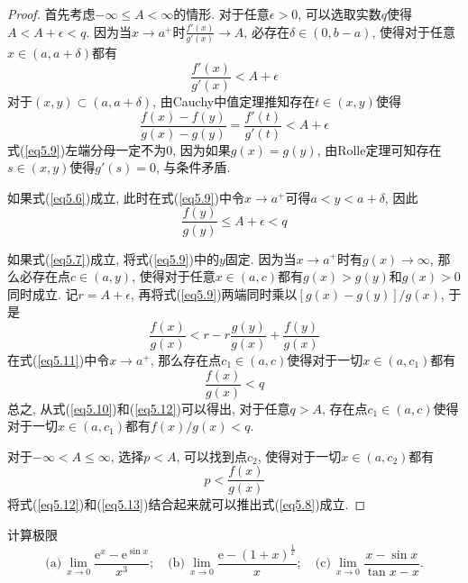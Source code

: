 \documentclass[cn,12pt,math=mtpro2,citestyle=gb7714-2015,bibstyle=gb7714-2015,twocol]{elegantbook}
\begin{document}
\begin{proof}
  首先考虑$-\infty\leq A<\infty$的情形. 对于任意$\epsilon>0$, 可以选取实数$q$使得$A<A+\epsilon<q$. 因为当$x\rightarrow a^+$时$\displaystyle\frac{f'(x)}{g'(x)}\rightarrow A$, 必存在$\delta\in (0,b-a)$, 使得对于任意$x\in(a,a+\delta)$都有
  $$\frac{f'(x)}{g'(x)}<A+\epsilon$$
  对于$(x,y)\subset (a,a+\delta)$, 由Cauchy中值定理推知存在$t\in(x,y)$使得
  \begin{equation}\label{eq5.9}
    \frac{f(x)-f(y)}{g(x)-g(y)}=\frac{f'(t)}{g'(t)}<A+\epsilon
  \end{equation}
  式(\ref{eq5.9})左端分母一定不为$0$, 因为如果$g(x)=g(y)$, 由Rolle定理可知存在$s\in(x,y)$使得$g'(s)=0$, 与条件矛盾.

  如果式(\ref{eq5.6})成立, 此时在式(\ref{eq5.9})中令$x\rightarrow a^+$可得$a<y<a+\delta$, 因此
  \begin{equation}\label{eq5.10}
    \frac{f(y)}{g(y)}\leq A+\epsilon<q
  \end{equation}

  如果式(\ref{eq5.7})成立, 将式(\ref{eq5.9})中的$y$固定. 因为当$x\rightarrow a^+$时有$g(x)\rightarrow\infty$, 那么必存在点$c\in (a,y)$, 使得对于任意$x\in (a,c)$都有$g(x)>g(y)$和$g(x)>0$同时成立. 记$r=A+\epsilon$, 再将式(\ref{eq5.9})两端同时乘以$[g(x)-g(y)]/g(x)$, 于是
  \begin{equation}\label{eq5.11}
    \frac{f(x)}{g(x)}<r-r\frac{g(y)}{g(x)}+\frac{f(y)}{g(x)}
  \end{equation}
  在式(\ref{eq5.11})中令$x\rightarrow a^+$, 那么存在点$c_1\in(a,c)$使得对于一切$x\in (a,c_1)$都有
  \begin{equation}\label{eq5.12}
    \frac{f(x)}{g(x)}<q
  \end{equation}
  总之, 从式(\ref{eq5.10})和(\ref{eq5.12})可以得出, 对于任意$q>A$, 存在点$c_1\in (a,c)$使得对于一切$x\in (a,c_1)$都有$f(x)/g(x)<q$.

  对于$-\infty<A\leq\infty$, 选择$p<A$, 可以找到点$c_2$, 使得对于一切$x\in (a,c_2)$都有
  \begin{equation}\label{eq5.13}
    p<\frac{f(x)}{g(x)}
  \end{equation}
  将式(\ref{eq5.12})和(\ref{eq5.13})结合起来就可以推出式(\ref{eq5.8})成立.

\end{proof}
\begin{example}
计算极限
$$\text{(a)}\, \lim_{x\to0}\frac{\text{e}^x-\text{e}^{\sin x}}{x^3};\quad \text{(b)}\,\lim_{x\to 0}\frac{\text{e}-(1+x)^{\frac{1}{x}}}{x};\quad \text{(c)}\,\lim_{x\to0}\frac{x-\sin x}{\tan x-x}.$$
\end{example}
\end{document}
